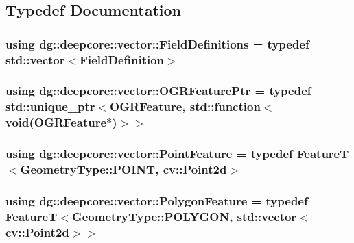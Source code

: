 \subsection{Typedef Documentation}
\subsubsection[{\texorpdfstring{Field\+Definitions}{FieldDefinitions}}]{\setlength{\rightskip}{0pt plus 5cm}using {\bf dg\+::deepcore\+::vector\+::\+Field\+Definitions} = typedef std\+::vector$<${\bf Field\+Definition}$>$}\hypertarget{namespacedg_1_1deepcore_1_1vector_a89a39c2fa657ff95f116cfed4a951386}{}\label{namespacedg_1_1deepcore_1_1vector_a89a39c2fa657ff95f116cfed4a951386}
\subsubsection[{\texorpdfstring{O\+G\+R\+Feature\+Ptr}{OGRFeaturePtr}}]{\setlength{\rightskip}{0pt plus 5cm}using {\bf dg\+::deepcore\+::vector\+::\+O\+G\+R\+Feature\+Ptr} = typedef std\+::unique\+\_\+ptr$<$O\+G\+R\+Feature, std\+::function$<$void(O\+G\+R\+Feature$\ast$)$>$$>$}\hypertarget{namespacedg_1_1deepcore_1_1vector_ab18ed4ff537b320bfc6ab749908f0192}{}\label{namespacedg_1_1deepcore_1_1vector_ab18ed4ff537b320bfc6ab749908f0192}
\subsubsection[{\texorpdfstring{Point\+Feature}{PointFeature}}]{\setlength{\rightskip}{0pt plus 5cm}using {\bf dg\+::deepcore\+::vector\+::\+Point\+Feature} = typedef {\bf FeatureT}$<${\bf Geometry\+Type\+::\+P\+O\+I\+NT}, cv\+::\+Point2d$>$}\hypertarget{namespacedg_1_1deepcore_1_1vector_a2e8401e06dc8648dfe778b719b9a3c19}{}\label{namespacedg_1_1deepcore_1_1vector_a2e8401e06dc8648dfe778b719b9a3c19}
\subsubsection[{\texorpdfstring{Polygon\+Feature}{PolygonFeature}}]{\setlength{\rightskip}{0pt plus 5cm}using {\bf dg\+::deepcore\+::vector\+::\+Polygon\+Feature} = typedef {\bf FeatureT}$<${\bf Geometry\+Type\+::\+P\+O\+L\+Y\+G\+ON}, std\+::vector$<$cv\+::\+Point2d$>$$>$}\hypertarget{namespacedg_1_1deepcore_1_1vector_a9c0dc25684d925c9b90c71145c8b8645}{}\label{namespacedg_1_1deepcore_1_1vector_a9c0dc25684d925c9b90c71145c8b8645}
